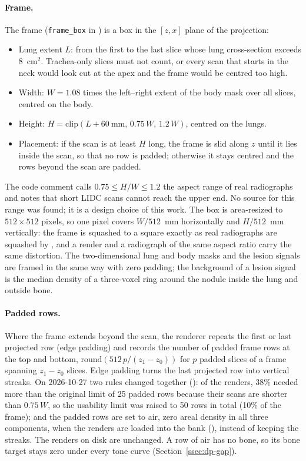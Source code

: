\paragraph{Frame.} The frame (\texttt{frame\_box} in ) is a box in the $[z,x]$ plane of the projection:
\begin{itemize}
\item Lung extent $L$: from the first to the last slice whose lung cross-section exceeds 8~cm$^2$. Trachea-only slices must not count, or every
scan that starts in the neck would look cut at the apex and the frame would be centred too high.
\item Width: $W=1.08$ times the left--right extent of the body mask over all slices, centred on the body.
\item Height: $H=\mathrm{clip}(L+60~\mathrm{mm},\,0.75\,W,\,1.2\,W)$, centred on the lungs.
\item Placement: if the scan is at least $H$ long, the frame is slid along $z$ until it lies inside the scan, so that no row is padded; otherwise
it stays centred and the rows beyond the scan are padded.
\end{itemize}
The code comment calls $0.75\le H/W\le1.2$ the aspect range of real radiographs and notes that short LIDC scans cannot reach the upper end.
No source for this range was found; it is a design choice of this work.
The box is area-resized to $512\times512$ pixels, so one pixel covers $W/512$~mm horizontally and $H/512$~mm vertically: the frame is squashed to
a square exactly as real radiographs are squashed by , and a render and a radiograph of the same aspect ratio carry the same
distortion. The two-dimensional lung and body masks and the lesion signals are framed in the same way with zero padding; the background of a lesion
signal is the median density of a three-voxel ring around the nodule inside the lung and outside bone.

\paragraph{Padded rows.} Where the frame extends beyond the scan, the renderer repeats the first or last projected row (edge padding) and records
the number of padded frame rows at the top and bottom, $\mathrm{round}(512\,p/(z_1-z_0))$ for $p$ padded slices of a frame spanning $z_1-z_0$
slices. Edge padding turns the last projected row into vertical streaks. On 2026-10-27 two rules changed together (): of the
renders, 38\% needed more than the original limit of 25 padded rows because their scans are shorter than $0.75\,W$, so the usability limit was
raised to 50 rows in total (10\% of the frame); and the padded rows are set to air, zero areal density in all three components, when the renders
are loaded into the bank (), instead of keeping the streaks. The renders on disk are unchanged. A row of air has no bone, so its
bone target stays zero under every tone curve (Section~\ref{ssec:dp-gap}).

